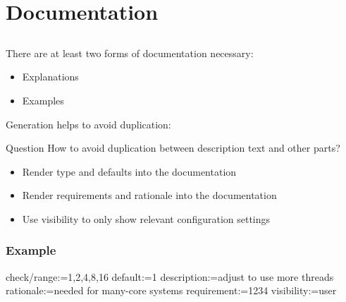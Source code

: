 \section{Documentation}

\subsection{}


\begin{frame}
\end{frame}

\begin{frame}
	There are at least two forms of documentation necessary:

	\begin{itemize}
	\item Explanations
	\item Examples
	\end{itemize}

	Generation helps to avoid duplication:

\end{frame}

\begin{frame}
	\begin{alertblock}{Question}
	How to avoid duplication between description text and other parts?
	\end{alertblock}

	\pause

	\begin{itemize}
	\item Render type and defaults into the documentation
	\item Render requirements and rationale into the documentation
	\item Use visibility to only show relevant configuration settings
	\end{itemize}
\end{frame}

\begin{frame}[fragile]
	\frametitle{Example}

	\begin{code}
	  check/range:=1,2,4,8,16
	  default:=1
	  description:=adjust to use more threads
	  rationale:=needed for many-core systems
	  requirement:=1234
	  visibility:=user
	\end{code}
\end{frame}

